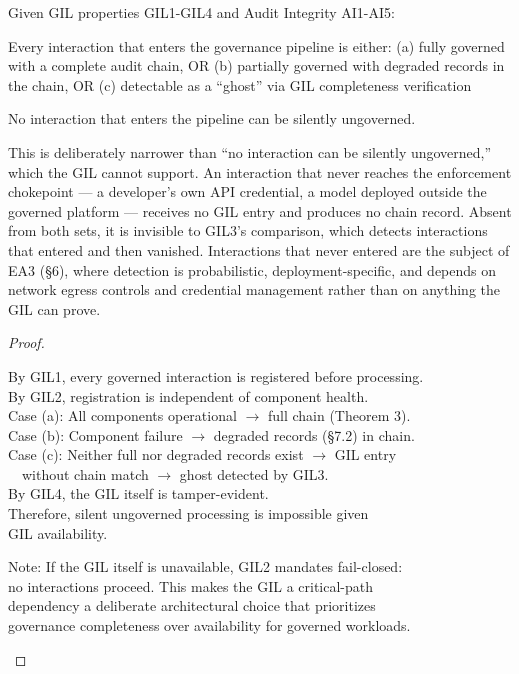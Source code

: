 \begin{cthm}
Given GIL properties GIL1-GIL4 and Audit Integrity AI1-AI5:

Every interaction that enters the governance pipeline is either: (a) fully governed with a complete audit chain, OR (b) partially governed with degraded records in the chain, OR (c) detectable as a ``ghost'' via GIL completeness verification

No interaction that enters the pipeline can be silently ungoverned.

This is deliberately narrower than ``no interaction can be silently ungoverned,'' which the GIL cannot support. An interaction that never reaches the enforcement chokepoint --- a developer's own API credential, a model deployed outside the governed platform --- receives no GIL entry and produces no chain record. Absent from both sets, it is invisible to GIL3's comparison, which detects interactions that entered and then vanished. Interactions that never entered are the subject of EA3 (\S{}6), where detection is probabilistic, deployment-specific, and depends on network egress controls and credential management rather than on anything the GIL can prove.

\end{cthm}

\begin{proof}
\begin{claddisp}
By GIL1, every governed interaction is registered before processing.\\
By GIL2, registration is independent of component health.\\
Case (a): All components operational $\to$ full chain (Theorem 3).\\
Case (b): Component failure $\to$ degraded records (\S{}7.2) in chain.\\
Case (c): Neither full nor degraded records exist $\to$ GIL entry\\
~~without chain match $\to$ ghost detected by GIL3.\\
By GIL4, the GIL itself is tamper-evident.\\
Therefore, silent ungoverned processing is impossible given\\
GIL availability.\\
\end{claddisp}
\begin{claddisp}
Note: If the GIL itself is unavailable, GIL2 mandates fail-closed:\\
no interactions proceed. This makes the GIL a critical-path\\
dependency \textemdash{} a deliberate architectural choice that prioritizes\\
governance completeness over availability for governed workloads.\\
\end{claddisp}
\end{proof}


